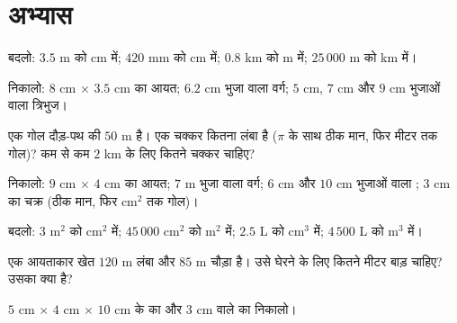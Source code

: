\section{अभ्यास}

\begin{exercise}[$\star$]\label{exo:g6:measure:1}
बदलो: $3.5$ m को cm में; $420$ mm को cm में; $0.8$ km को m में;
$25\,000$ m को km में।
\end{exercise}

\begin{exercise}[$\star$]\label{exo:g6:measure:2}
 निकालो: $8$ cm $\times$ $3.5$ cm का आयत; $6.2$ cm भुजा
वाला वर्ग; $5$ cm, $7$ cm और $9$ cm भुजाओं वाला
त्रिभुज।
\end{exercise}

\begin{exercise}[$\star$]\label{exo:g6:measure:3}
एक गोल दौड़-पथ की  $50$ m है। एक चक्कर कितना लंबा है
($\pi$ के साथ ठीक मान, फिर मीटर तक गोल)? कम से कम $2$ km के लिए
कितने चक्कर चाहिए?
\end{exercise}

\begin{exercise}[$\star$]\label{exo:g6:measure:4}
 निकालो: $9$ cm $\times$ $4$ cm का आयत; $7$ m भुजा
वाला वर्ग; $6$ cm और $10$ cm भुजाओं वाला ; $3$ cm
 का चक्र (ठीक मान, फिर cm$^2$ तक गोल)।
\end{exercise}

\begin{exercise}[$\star$]\label{exo:g6:measure:5}
बदलो: $3$ m$^2$ को cm$^2$ में; $45\,000$ cm$^2$ को m$^2$ में; $2.5$ L
को cm$^3$ में; $4\,500$ L को m$^3$ में।
\end{exercise}

\begin{exercise}[$\star$]\label{exo:g6:measure:6}
एक आयताकार खेत $120$ m लंबा और $85$ m चौड़ा है। उसे घेरने के लिए
कितने मीटर बाड़ चाहिए? उसका  क्या है?
\end{exercise}

\begin{exercise}[$\star$]\label{exo:g6:measure:7}
$5$ cm $\times$ $4$ cm $\times$ $10$ cm के  का और $3$ cm
 वाले  का  निकालो।
\end{exercise}

